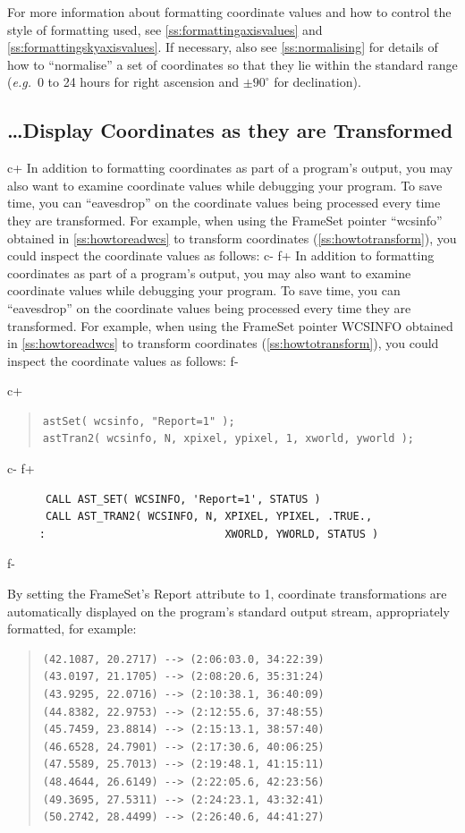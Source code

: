 \documentclass[twoside,11pt]{article}
\newcommand{\secref}[1]{\S\ref{#1}}
\renewcommand{\secref}[1]{\ref{#1}}
\begin{document}
For more information about formatting coordinate values and how to
control the style of formatting used, see
\secref{ss:formattingaxisvalues} and
\secref{ss:formattingskyaxisvalues}. If necessary, also see
\secref{ss:normalising} for details of how to ``normalise'' a set of
coordinates so that they lie within the standard range ({\em{e.g.}}\ 0
to 24 hours for right ascension and $\pm 90^\circ$ for
declination).

\subsection{\ldots Display Coordinates as they are Transformed}

c+
In addition to formatting coordinates as part of a program's output,
you may also want to examine coordinate values while debugging your
program. To save time, you can ``eavesdrop'' on the coordinate values
being processed every time they are transformed. For example, when
using the FrameSet pointer ``wcsinfo'' obtained in
\secref{ss:howtoreadwcs} to transform coordinates
(\secref{ss:howtotransform}), you could inspect the coordinate values
as follows:
c-
f+
In addition to formatting coordinates as part of a program's output,
you may also want to examine coordinate values while debugging your
program. To save time, you can ``eavesdrop'' on the coordinate values
being processed every time they are transformed. For example, when
using the FrameSet pointer WCSINFO obtained in
\secref{ss:howtoreadwcs} to transform coordinates
(\secref{ss:howtotransform}), you could inspect the coordinate values
as follows:
f-

c+
\begin{quote}
\small
\begin{verbatim}
astSet( wcsinfo, "Report=1" );
astTran2( wcsinfo, N, xpixel, ypixel, 1, xworld, yworld );
\end{verbatim}
\normalsize
\end{quote}
c-
f+
\small
\begin{verbatim}
      CALL AST_SET( WCSINFO, 'Report=1', STATUS )
      CALL AST_TRAN2( WCSINFO, N, XPIXEL, YPIXEL, .TRUE.,
     :                            XWORLD, YWORLD, STATUS )
\end{verbatim}
\normalsize
f-

By setting the FrameSet's Report attribute to 1, coordinate
transformations are automatically displayed on the program's standard
output stream, appropriately formatted, for example:

\begin{quote}
\begin{verbatim}
(42.1087, 20.2717) --> (2:06:03.0, 34:22:39)
(43.0197, 21.1705) --> (2:08:20.6, 35:31:24)
(43.9295, 22.0716) --> (2:10:38.1, 36:40:09)
(44.8382, 22.9753) --> (2:12:55.6, 37:48:55)
(45.7459, 23.8814) --> (2:15:13.1, 38:57:40)
(46.6528, 24.7901) --> (2:17:30.6, 40:06:25)
(47.5589, 25.7013) --> (2:19:48.1, 41:15:11)
(48.4644, 26.6149) --> (2:22:05.6, 42:23:56)
(49.3695, 27.5311) --> (2:24:23.1, 43:32:41)
(50.2742, 28.4499) --> (2:26:40.6, 44:41:27)
\end{verbatim}
\end{quote}
\end{document}
